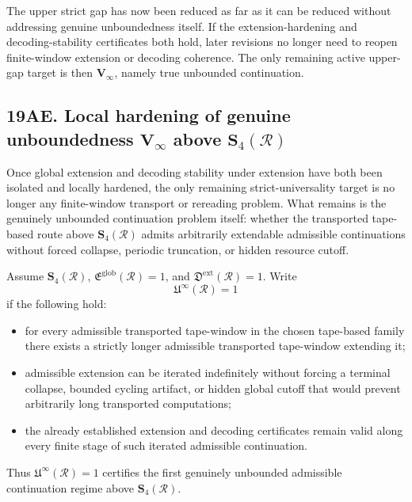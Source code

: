 \begin{corollary}
The upper strict gap has now been reduced as far as it can be reduced without addressing genuine unboundedness itself. If the extension-hardening and decoding-stability certificates both hold, later revisions no longer need to reopen finite-window extension or decoding coherence. The only remaining active upper-gap target is then \(\mathbf V_\infty\), namely true unbounded continuation.
\end{corollary}


\subsection*{19AE. Local hardening of genuine unboundedness \(\mathbf V_\infty\) above \(\mathbf S_4(\mathcal R)\)}
Once global extension and decoding stability under extension have both been isolated and locally hardened, the only remaining strict-universality target is no longer any finite-window transport or rereading problem. What remains is the genuinely unbounded continuation problem itself: whether the transported tape-based route above \(\mathbf S_4(\mathcal R)\) admits arbitrarily extendable admissible continuations without forced collapse, periodic truncation, or hidden resource cutoff.

\begin{definition}
Assume \(\mathbf S_4(\mathcal R)\), \(\mathfrak E^{\mathrm{glob}}(\mathcal R)=1\), and \(\mathfrak D^{\mathrm{ext}}(\mathcal R)=1\).
Write
\[
\mathfrak U^{\infty}(\mathcal R)=1
\]
if the following hold:
\begin{itemize}[leftmargin=2em]
  \item for every admissible transported tape-window in the chosen tape-based family there exists a strictly longer admissible transported tape-window extending it;
  \item admissible extension can be iterated indefinitely without forcing a terminal collapse, bounded cycling artifact, or hidden global cutoff that would prevent arbitrarily long transported computations;
  \item the already established extension and decoding certificates remain valid along every finite stage of such iterated admissible continuation.
\end{itemize}
Thus \(\mathfrak U^{\infty}(\mathcal R)=1\) certifies the first genuinely unbounded admissible continuation regime above \(\mathbf S_4(\mathcal R)\).
\end{definition}

